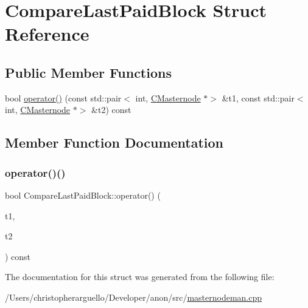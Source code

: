 \hypertarget{struct_compare_last_paid_block}{}\section{Compare\+Last\+Paid\+Block Struct Reference}
\label{struct_compare_last_paid_block}
\subsection*{Public Member Functions}
\begin{DoxyCompactItemize}
\item 
bool \mbox{\hyperlink{struct_compare_last_paid_block_af8a7c47ed74e1ca7bdfbd303d96a3e8e}{operator()}} (const std\+::pair$<$ int, \mbox{\hyperlink{class_c_masternode}{C\+Masternode}} $\ast$$>$ \&t1, const std\+::pair$<$ int, \mbox{\hyperlink{class_c_masternode}{C\+Masternode}} $\ast$$>$ \&t2) const
\end{DoxyCompactItemize}


\subsection{Member Function Documentation}
\mbox{\label{struct_compare_last_paid_block_af8a7c47ed74e1ca7bdfbd303d96a3e8e}} 
\subsubsection{\texorpdfstring{operator()()}{operator()()}}
{\footnotesize\ttfamily bool Compare\+Last\+Paid\+Block\+::operator() (\begin{DoxyParamCaption}\item[{const std\+::pair$<$ int, \mbox{\hyperlink{class_c_masternode}{C\+Masternode}} $\ast$$>$ \&}]{t1,  }\item[{const std\+::pair$<$ int, \mbox{\hyperlink{class_c_masternode}{C\+Masternode}} $\ast$$>$ \&}]{t2 }\end{DoxyParamCaption}) const\hspace{0.3cm}{\ttfamily [inline]}}



The documentation for this struct was generated from the following file\+:\begin{DoxyCompactItemize}
\item 
/\+Users/christopherarguello/\+Developer/anon/src/\mbox{\hyperlink{masternodeman_8cpp}{masternodeman.\+cpp}}\end{DoxyCompactItemize}
